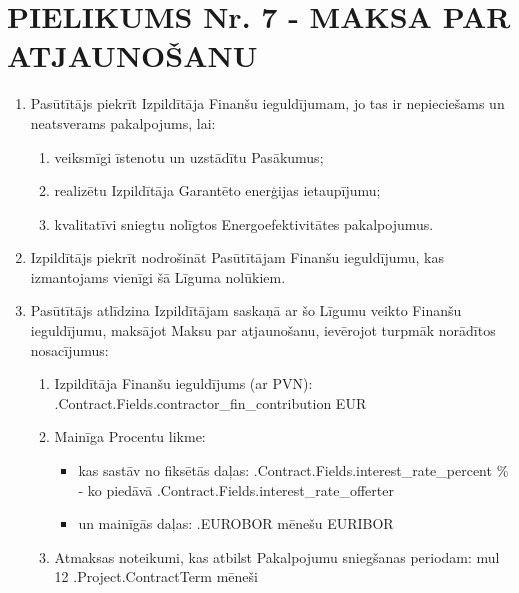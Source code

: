 \section{PIELIKUMS Nr. 7 {-} MAKSA PAR ATJAUNOŠANU}

\begin{enumerate}[label=\arabic*.]
	\item Pasūtītājs piekrīt Izpildītāja Finanšu ieguldījumam, jo tas ir nepieciešams un neatsverams pakalpojums, lai:
	\begin{enumerate}
		\item veiksmīgi īstenotu un uzstādītu Pasākumus;
		\item realizētu Izpildītāja Garantēto enerģijas ietaupījumu;
		\item kvalitatīvi sniegtu nolīgtos Energoefektivitātes pakalpojumus.
	\end{enumerate}

	\item Izpildītājs piekrīt nodrošināt Pasūtītājam Finanšu ieguldījumu, kas izmantojams vienīgi šā Līguma nolūkiem.
	\item Pasūtītājs atlīdzina Izpildītājam saskaņā ar šo Līgumu veikto Finanšu ieguldījumu, maksājot Maksu par atjaunošanu, ievērojot turpmāk norādītos nosacījumus:
	\begin{enumerate}
		\item Izpildītāja Finanšu ieguldījums (ar PVN): \iffalse input fields.contractor_fin_contribution value="{{.Contract.Fields.contractor_fin_contribution}}" \fi {{.Contract.Fields.contractor_fin_contribution}} EUR
		\item Mainīga Procentu likme:
			\begin{itemize}
				\item kas sastāv no fiksētās daļas: \iffalse input fields.interest_rate_percent value="{{.Contract.Fields.interest_rate_percent}}" \fi {{.Contract.Fields.interest_rate_percent}} \% {-} ko piedāvā \iffalse input fields.interest_rate_offerter value="{{.Contract.Fields.interest_rate_offerter}}" \fi {{.Contract.Fields.interest_rate_offerter}}
				\item un mainīgās daļas: {{.EUROBOR}} mēnešu EURIBOR
			\end{itemize}
		\item Atmaksas noteikumi, kas atbilst Pakalpojumu sniegšanas periodam: {{mul 12 .Project.ContractTerm}} mēneši
	\end{enumerate}


\end{enumerate}
